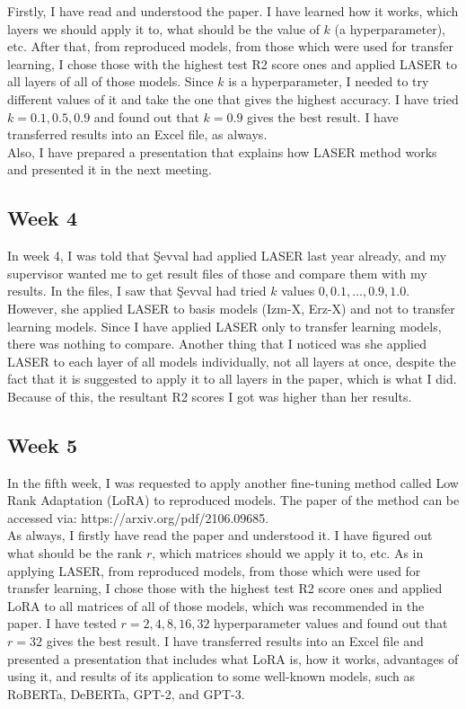 \documentclass{article}
\begin{document}
Firstly, I have read and understood the paper. I have learned how it works, which layers we should apply it to, what should be the value of $k$ (a hyperparameter), etc. After that, from reproduced models, from those which were used for transfer learning, I chose those with the highest test R2 score ones and applied LASER to all layers of all of those models. Since $k$ is a hyperparameter, I needed to try different values of it and take the one that gives the highest accuracy. I have tried $k=0.1, 0.5, 0.9$ and found out that $k=0.9$ gives the best result. I have transferred results into an Excel file, as always.\\

Also, I have prepared a presentation that explains how LASER method works and presented it in the next meeting.

\subsection{Week 4}
\hspace{0.5cm}
In week 4, I was told that Şevval had applied LASER last year already, and my supervisor wanted me to get result files of those and compare them with my results. In the files, I saw that Şevval had tried $k$ values $0, 0.1, ..., 0.9, 1.0$. However, she applied LASER to basis models (Izm-X, Erz-X) and not to transfer learning models. Since I have applied LASER only to transfer learning models, there was nothing to compare. Another thing that I noticed was she applied LASER to each layer of all models individually, not all layers at once, despite the fact that it is suggested to apply it to all layers in the paper, which is what I did. Because of this, the resultant R2 scores I got was higher than her results.

\subsection{Week 5}
\hspace{0.5cm}
In the fifth week, I was requested to apply another fine-tuning method called Low Rank Adaptation (LoRA) to reproduced models. The paper of the method can be accessed via: https://arxiv.org/pdf/2106.09685.\\

As always, I firstly have read the paper and understood it. I have figured out what should be the rank $r$, which matrices should we apply it to, etc. As in applying LASER, from reproduced models, from those which were used for transfer learning, I chose those with the highest test R2 score ones and applied LoRA to all matrices of all of those models, which was recommended in the paper. I have tested $r=2,4,8,16,32$ hyperparameter values and found out that $r=32$ gives the best result. I have transferred results into an Excel file and presented a presentation that includes what LoRA is, how it works, advantages of using it, and results of its application to some well-known models, such as RoBERTa, DeBERTa, GPT-2, and GPT-3.
\end{document}
